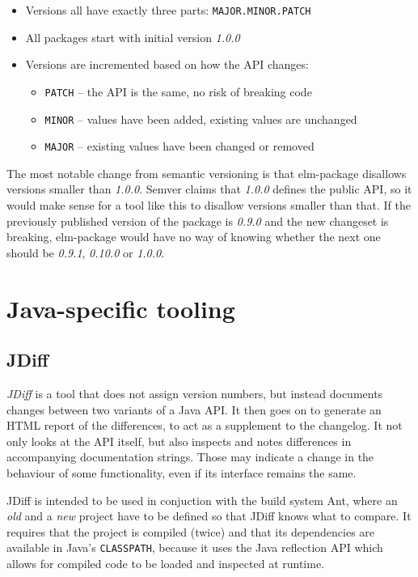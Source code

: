\documentclass{l4proj}
\newcommand\genericstyle{\lstset{basicstyle=\ttm}}
\newcommand\codeinline[1]{{\genericstyle\lstinline!#1!}}
\begin{document}
\begin{itemize}
\item Versions all have exactly three parts: \codeinline{MAJOR.MINOR.PATCH}
\item All packages start with initial version \textit{1.0.0}
\item Versions are incremented based on how the API changes:
\begin{itemize}
\item \codeinline{PATCH} -- the API is the same, no risk of breaking code
\item \codeinline{MINOR} -- values have been added, existing values
are unchanged
\item \codeinline{MAJOR} -- existing values have been changed or removed
\end{itemize}
\end{itemize}

The most notable change from semantic versioning is that elm-package
disallows versions smaller than \textit{1.0.0}. Semver claims that
\textit{1.0.0} defines the public API, so it would make sense for a
tool like this to disallow versions smaller than that. If the
previously published version of the package is \textit{0.9.0} and the
new changeset is breaking, elm-package would have no way of knowing
whether the next one should be \textit{0.9.1}, \textit{0.10.0} or
\textit{1.0.0}.

\vspace{-1\baselineskip}%

\section{Java-specific tooling}

\subsection{JDiff}

\textit{JDiff} \cite{JDiff} is a tool that does not assign version
numbers, but instead documents changes between two variants of a Java API.
It then goes on to generate an HTML report of the differences, to act
as a supplement to the changelog. It not only looks at the API itself,
but also inspects and notes differences in accompanying documentation
strings. Those may indicate a change in the behaviour of some functionality,
even if its interface remains the same.

JDiff is intended to be used in conjuction with the build system Ant,
where an \textit{old} and a \textit{new} project have to be defined so
that JDiff knows what to compare. It requires that the project is
compiled (twice) and that its dependencies are available in Java's
\codeinline{CLASSPATH}, because it uses the Java reflection API which
allows for compiled code to be loaded and inspected at runtime.
\end{document}
